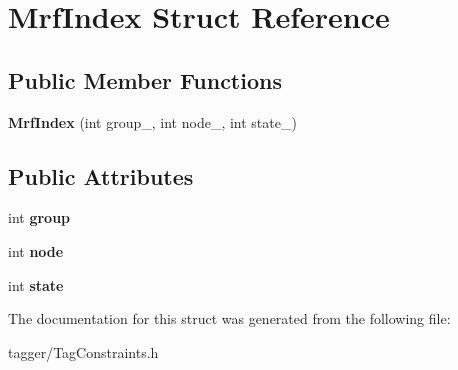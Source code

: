 \hypertarget{structMrfIndex}{
\section{MrfIndex Struct Reference}
\label{structMrfIndex}
}
\subsection*{Public Member Functions}
\begin{DoxyCompactItemize}
\item 
\hypertarget{structMrfIndex_adc62126e39eeccb67aed83b8d33514e9}{
{\bfseries MrfIndex} (int group\_\-, int node\_\-, int state\_\-)}
\label{structMrfIndex_adc62126e39eeccb67aed83b8d33514e9}

\end{DoxyCompactItemize}
\subsection*{Public Attributes}
\begin{DoxyCompactItemize}
\item 
\hypertarget{structMrfIndex_a10be38457b3798cfdf70f224814ce8eb}{
int {\bfseries group}}
\label{structMrfIndex_a10be38457b3798cfdf70f224814ce8eb}

\item 
\hypertarget{structMrfIndex_a9c765fbc8576d8d6541a072eb75c2c8a}{
int {\bfseries node}}
\label{structMrfIndex_a9c765fbc8576d8d6541a072eb75c2c8a}

\item 
\hypertarget{structMrfIndex_a2cea032a5c169945c3c0e8d96fbc1477}{
int {\bfseries state}}
\label{structMrfIndex_a2cea032a5c169945c3c0e8d96fbc1477}

\end{DoxyCompactItemize}


The documentation for this struct was generated from the following file:\begin{DoxyCompactItemize}
\item 
tagger/TagConstraints.h\end{DoxyCompactItemize}
